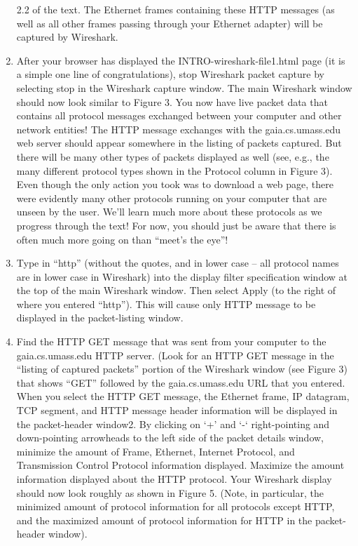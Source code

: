 \documentclass[11pt,a4paper]{article}
\begin{document}
\begin{enumerate}
    2.2 of the text. The Ethernet frames containing these HTTP messages (as well as
    all other frames passing through your Ethernet adapter) will be captured by
    Wireshark.
    \item After your browser has displayed the INTRO-wireshark-file1.html page (it is a
    simple one line of congratulations), stop Wireshark packet capture by selecting
    stop in the Wireshark capture window. The main Wireshark window should now
    look similar to Figure 3. You now have live packet data that contains all protocol
    messages exchanged between your computer and other network entities! The
    HTTP message exchanges with the gaia.cs.umass.edu web server should appear
    somewhere in the listing of packets captured. But there will be many other types
    of packets displayed as well (see, e.g., the many different protocol types shown in
    the Protocol column in Figure 3). Even though the only action you took was to
    download a web page, there were evidently many other protocols running on your
    computer that are unseen by the user. We’ll learn much more about these
    protocols as we progress through the text! For now, you should just be aware that
    there is often much more going on than “meet’s the eye”!
    \item Type in “http” (without the quotes, and in lower case – all protocol names are in
    lower case in Wireshark) into the display filter specification window at the top of
    the main Wireshark window. Then select Apply (to the right of where you entered
    “http”). This will cause only HTTP message to be displayed in the packet-listing
    window.
    \item Find the HTTP GET message that was sent from your computer to the
    gaia.cs.umass.edu HTTP server. (Look for an HTTP GET message in the “listing
    of captured packets” portion of the Wireshark window (see Figure 3) that shows
    “GET” followed by the gaia.cs.umass.edu URL that you entered. When you
    select the HTTP GET message, the Ethernet frame, IP datagram, TCP segment,
    and HTTP message header information will be displayed in the packet-header
    window2. By clicking on ‘+’ and ‘-‘ right-pointing and down-pointing arrowheads
    to the left side of the packet details window, minimize the amount of Frame,
    Ethernet, Internet Protocol, and Transmission Control Protocol information
    displayed. Maximize the amount information displayed about the HTTP protocol.
    Your Wireshark display should now look roughly as shown in Figure 5. (Note, in
    particular, the minimized amount of protocol information for all protocols except
    HTTP, and the maximized amount of protocol information for HTTP in the
    packet-header window).
     
\end{enumerate}
\end{document}
